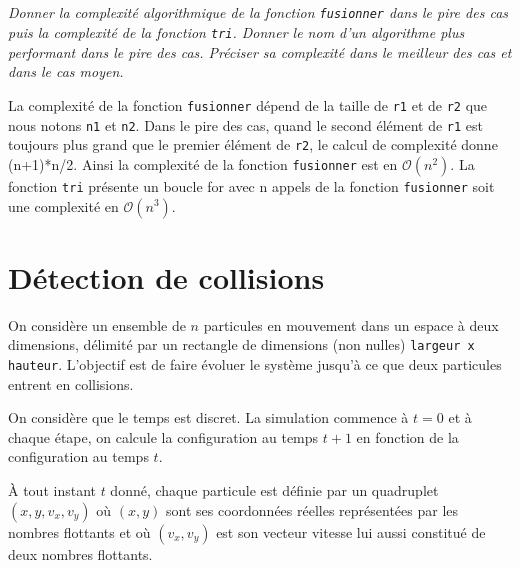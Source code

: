 \documentclass[10pt,fleqn]{article} %
\begin{document}
\subparagraph{}
\textit{Donner la complexité algorithmique de la fonction \texttt{fusionner} dans le pire des cas puis la complexité de la fonction \texttt{tri}.
Donner le nom d'un algorithme plus performant dans le pire des cas. Préciser sa complexité dans le meilleur des cas et dans le cas moyen.}
\ifprof
\begin{corrige}
La complexité de la fonction \texttt{fusionner} dépend de la taille de \texttt{r1} et de \texttt{r2} que nous notons \texttt{n1} et \texttt{n2}.
Dans le pire des cas, quand le second élément de \texttt{r1} est toujours plus grand que le premier élément de \texttt{r2}, le calcul de complexité donne (n+1)*n/2. Ainsi la complexité de la fonction \texttt{fusionner} est en $\mathcal{O}(n^2)$.
La fonction \texttt{tri} présente un boucle for avec n appels de la fonction \texttt{fusionner} soit une complexité en $\mathcal{O}(n^3)$.
\end{corrige}
\else
\fi


\newpage
\section*{Détection de collisions}
\ifprof
\else

On considère un ensemble de $n$ particules en mouvement dans un espace à deux dimensions, délimité par un rectangle de dimensions (non nulles) \texttt{largeur x hauteur}. L'objectif est de faire évoluer le système jusqu'à ce que deux particules entrent en collisions.

On considère que le temps est discret. La simulation commence à $t=0$ et à chaque étape, on calcule la configuration au temps $t+1$ en fonction de la configuration au temps $t$. 

À tout instant $t$ donné, chaque particule est définie par un quadruplet $(x,y,v_x,v_y)$ où $(x,y)$ sont ses coordonnées réelles représentées par les nombres flottants et où $(v_x,v_y)$ est son vecteur vitesse lui aussi constitué de deux nombres flottants. 
\end{document}
